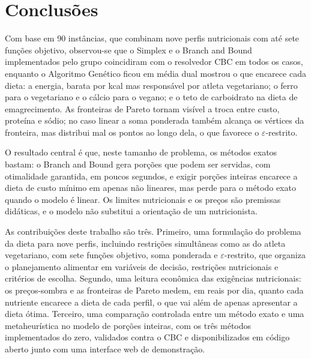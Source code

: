 \documentclass[12pt]{article}
\begin{document}
\begin{table}[!htbp]
\centering
\caption{Custo computacional por método.}\label{tab:tempos}
\footnotesize

\end{table}

\section{Conclusões}\label{sec:conclusao}

Com base em 90 instâncias, que combinam nove perfis nutricionais com até sete funções
objetivo, observou-se que o Simplex e o Branch and Bound implementados pelo grupo
coincidiram com o resolvedor CBC em todos os casos, enquanto o Algoritmo Genético
ficou em média %
dual mostrou o que encarece cada dieta: a energia, barata por kcal mas responsável por
atleta vegetariano; o ferro para o vegetariano e o cálcio para o vegano; e o teto de
carboidrato na dieta de emagrecimento. As fronteiras de Pareto tornam visível a troca
entre custo, proteína e sódio; no caso linear a soma ponderada também alcança os
vértices da fronteira, mas distribui mal os pontos ao longo dela, o que favorece o
$\varepsilon$-restrito.

O resultado central é que, neste tamanho de problema, os métodos exatos bastam: o
Branch and Bound gera porções que podem ser servidas, com otimalidade garantida, em
poucos segundos, e exigir porções inteiras encarece a dieta de custo mínimo em apenas
não lineares, mas perde para o método exato quando o modelo é linear. Os limites nutricionais e os preços
são premissas didáticas, e o modelo não substitui a orientação de um nutricionista.

As contribuições deste trabalho são três. Primeiro, uma formulação do problema da dieta
para nove perfis, incluindo restrições simultâneas como as do atleta vegetariano, com
sete funções objetivo, soma ponderada e $\varepsilon$-restrito, que organiza o
planejamento alimentar em variáveis de decisão, restrições nutricionais e critérios de
escolha. Segundo, uma leitura econômica das exigências nutricionais: os preços-sombra e
as fronteiras de Pareto medem, em reais por dia, quanto cada nutriente encarece a dieta
de cada perfil, o que vai além de apenas apresentar a dieta ótima. Terceiro, uma
comparação controlada entre um método exato e uma metaheurística no modelo de porções
inteiras, com os três métodos implementados do zero, validados contra o CBC e
disponibilizados em código aberto junto com uma interface web de demonstração.
\end{document}
